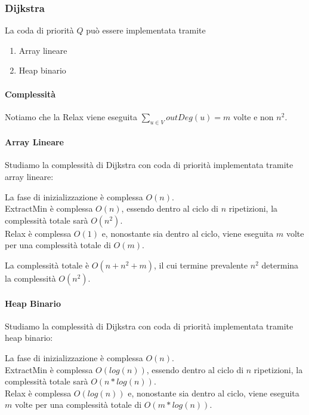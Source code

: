 \documentclass[tikz]{article}
\providecommand{\tightlist}{%
  \setlength{\itemsep}{0pt}\setlength{\parskip}{0pt}}
\let\oldparagraph\paragraph
\renewcommand{\paragraph}[1]{\oldparagraph{#1}\mbox{}}
\begin{document}
{{

\subsubsection{Dijkstra}



{La coda di priorità $Q$ può essere implementata tramite}

\begin{enumerate}
\tightlist
\item
  {Array lineare}
\item
  {Heap binario}
\end{enumerate}

\paragraph{Complessità}

Notiamo che la Relax viene eseguita $\sum_{u \in V}{outDeg(u)} = m$ volte e non $n^2$. 

\paragraph{Array Lineare}

{Studiamo la complessità di Dijkstra con coda di priorità implementata tramite array lineare:}

La fase di inizializzazione è complessa $O(n)$. \\
ExtractMin è complessa $O(n)$, essendo dentro al ciclo di $n$ ripetizioni, la complessità totale sarà $O(n^2)$. \\
Relax è complessa $O(1)$ e, nonostante sia dentro al ciclo, viene eseguita $m$ volte per una complessità totale di $O(m)$.

La complessità totale è $O(n+n^2+m)$, il cui termine prevalente $n^2$ determina la complessità $O(n^2)$.

\paragraph{Heap Binario}

{Studiamo la complessità di Dijkstra con coda di priorità implementata tramite heap binario:}

La fase di inizializzazione è complessa $O(n)$. \\
ExtractMin è complessa $O(log(n))$, essendo dentro al ciclo di $n$ ripetizioni, la complessità totale sarà $O(n*log(n))$. \\
Relax è complessa $O(log(n))$ e, nonostante sia dentro al ciclo, viene eseguita $m$ volte per una complessità totale di $O(m*log(n))$.

}}
\end{document}
